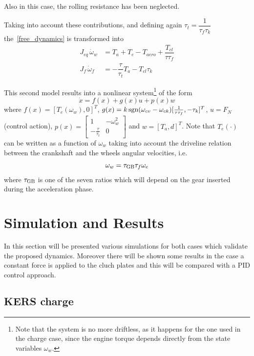 \documentclass[11pt]{article}
\begin{document}
Also in this case, the rolling resistance has been neglected.

Taking into account these contributions, and defining again $\tau_{t} = \dfrac{1}{\tau_f \tau_k}$ the~\eqref{free_dynamics} is transformed into 
\begin{equation}
\begin{split}
J_{eq}\, \dot{\omega}_w & = T_a + T_e - T_{aero} + \dfrac{T_{cl}}{\tau \tau_f}  \\
J_f\, \dot{\omega}_f & = -\dfrac{\tau}{\tau_{t}} T_a - T_{cl} \tau_k
\end{split}
\label{kers_full_dynamics_discharge}
\end{equation}

This second model results into a nonlinear system\footnote{Note that the system is no more driftless, as it happens for the one used in the charge case, since the engine torque depends directly from the state variables $\omega_w$.} of the form
\[
\dot{x} = f(x) + g(x)u + p(x)w 
\]
where $f(x) = [T_e(\omega_w), 0]^T$, $g(x) = k \, \textup{sgn} (\omega_{cv} - \omega_{ck}) [\frac{1}{\tau \tau_f} , -\tau_k]^T$, $u = F_N$ (control action), $p(x) =\left[  \begin{smallmatrix}
1 & -\omega_w^2 \\
-\frac{\tau}{\tau_t} & 0
\end{smallmatrix}\right] $
and $w = [T_a, d]^T$. Note that $T_e(\cdot)$ can be written as a function of $\omega_w$ taking into account the driveline relation between the crankshaft and the wheels angular velocities, i.e.
\begin{equation}
\omega_w = \tau_{\textup{GB}} \tau_f \omega_e
\label{driveline_relation}
\end{equation}
where $\tau_{\textup{GB}}$ is one of the seven ratios which will depend on the gear inserted during the acceleration phase.

\section{Simulation and Results}

In this section will be presented various simulations for both cases which validate the proposed dynamics. Moreover there will be shown some results in the case a constant force is applied to the cluch plates and this will be compared with a PID control approach.
\subsection{KERS charge}
\end{document}
